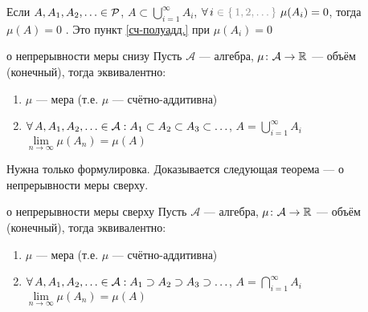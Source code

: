 \begin{slv}[https://www.youtube.com/live/OdDauqCjZt0?si=WgYtfSwoHQg006tq&t=12345]\label{объ.мн.меры0}
	Если $A, A_1, A_2, \ldots \in \mathcal{P}$, $A \subset \bigcup\limits_{i = 1}^\infty A_i$, $\A i \uns{{}\in \{\,1, 2, \ldots\,\}}\ \mu(A_i) = 0$, тогда $\mu(A) = 0$ . Это пункт \ref{сч-полуадд.} при $\mu(A_i) = 0$
\end{slv}

\begin{teor}[https://www.youtube.com/live/Ptfcl76lZBs?si=aaO9813UQcucBfHB&t=8902]{о непрерывности меры снизу}\label{непр.меры снизу}
	Пусть $\mathcal A$ --- алгебра, $\mu \colon \mathcal A \to \mathbb R$ --- объём (конечный), тогда эквивалентно:
	\begin{enumerate}
		\item $\mu$ --- мера (т.е. $\mu$ --- счётно-аддитивна)
		
		\item $\forall \, A, A_1, A_2, \ldots \in \mathcal A : A_1 \subset A_2 \subset A_3 \subset \ldots$, $A = \bigcup\limits_{i = 1}^\infty A_i$ $\lim\limits_{n \to \infty} \mu(A_n) = \mu(A)$ 
	\end{enumerate}
\end{teor}

\begin{prf}
	Нужна только формулировка. Доказывается следующая теорема --- о непрерывности меры сверху.
\end{prf}

\begin{teor}[https://www.youtube.com/live/Ptfcl76lZBs?si=aaO9813UQcucBfHB&t=8902]{о непрерывности меры сверху}\label{непр.меры сверху}
	Пусть $\mathcal A$ --- алгебра, $\mu \colon \mathcal A \to \mathbb R$ --- объём (конечный), тогда эквивалентно:
	\begin{enumerate}
		\item $\mu$ --- мера (т.е. $\mu$ --- счётно-аддитивна)
	
		\item $\forall \, A, A_1, A_2, \ldots \in \mathcal A : A_1 \supset A_2 \supset A_3 \supset \ldots$, $A = \bigcap\limits_{i = 1}^\infty A_i$ $\lim\limits_{n \to \infty} \mu(A_n) = \mu(A)$ 
	\end{enumerate}
\end{teor}

